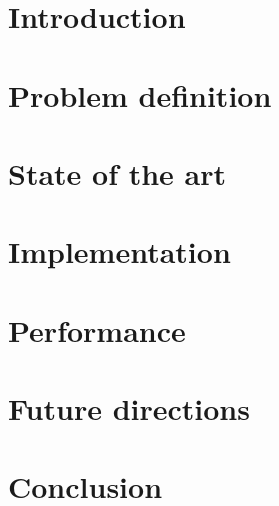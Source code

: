 






\chapter{Introduction}


\chapter{Problem definition}


\chapter{State of the art}


\chapter{Implementation}


\chapter{Performance}


\chapter{Future directions}


\chapter{Conclusion}



 

\appendix




